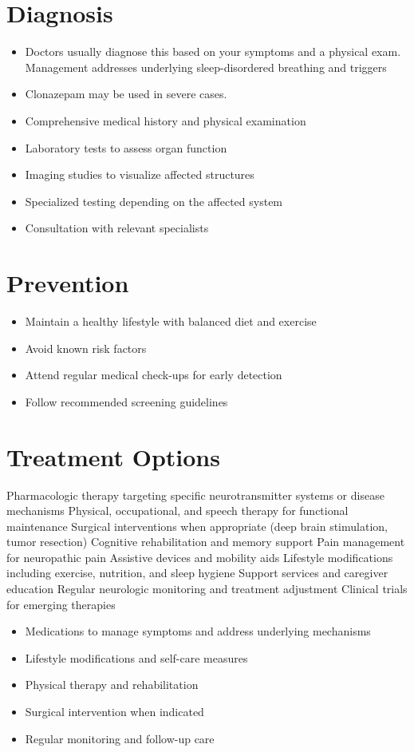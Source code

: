 \section{Diagnosis}
\begin{itemize}[noitemsep]
  \item Doctors usually diagnose this based on your symptoms and a physical exam. Management addresses underlying sleep-disordered breathing and triggers
  \item Clonazepam may be used in severe cases.
  \item Comprehensive medical history and physical examination
  \item Laboratory tests to assess organ function
  \item Imaging studies to visualize affected structures
  \item Specialized testing depending on the affected system
  \item Consultation with relevant specialists
\end{itemize}
\section{Prevention}
\begin{itemize}[noitemsep]
  \item Maintain a healthy lifestyle with balanced diet and exercise
  \item Avoid known risk factors
  \item Attend regular medical check-ups for early detection
  \item Follow recommended screening guidelines
\end{itemize}
\section{Treatment Options}
Pharmacologic therapy targeting specific neurotransmitter systems or disease mechanisms Physical, occupational, and speech therapy for functional maintenance Surgical interventions when appropriate (deep brain stimulation, tumor resection) Cognitive rehabilitation and memory support Pain management for neuropathic pain Assistive devices and mobility aids Lifestyle modifications including exercise, nutrition, and sleep hygiene Support services and caregiver education Regular neurologic monitoring and treatment adjustment Clinical trials for emerging therapies

\begin{itemize}[noitemsep]
  \item Medications to manage symptoms and address underlying mechanisms
  \item Lifestyle modifications and self-care measures
  \item Physical therapy and rehabilitation
  \item Surgical intervention when indicated
  \item Regular monitoring and follow-up care
\end{itemize}
